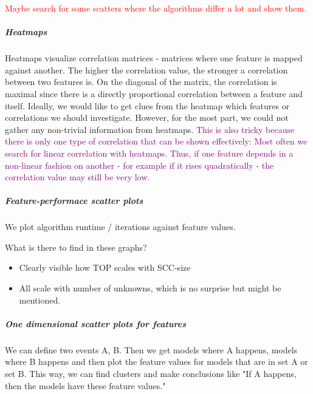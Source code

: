 \textcolor{red}{Maybe search for some scatters where the algorithms differ a lot and show them.}

\subparagraph*{Heatmaps}
Heatmaps visualize correlation matrices - matrices where one feature is mapped against another. The higher the correlation value, the stronger
a correlation between two features is. On the diagonal of the matrix, the correlation is maximal since there is a directly proportional correlation between
a feature and itself. Ideally, we would like to get clues from the heatmap which features or correlations we should investigate.
However, for the most part, we could not gather any non-trivial information from heatmaps. \textcolor{purple}{This is also tricky because
there is only one type of correlation that can be shown effectively: Most often we search for linear correlation with heatmaps. Thus,
if one feature depends in a non-linear fashion on another - for example if it rises quadratically - the correlation value may still be very low.}

\subparagraph*{Feature-performace scatter plots}
We plot algorithm runtime / iterations against feature values.

What is there to find in these graphs?
\begin{itemize}
    \item Clearly visible how TOP scales with SCC-size
    \item All scale with number of unknowns, which is no surprise but might be mentioned.
\end{itemize}

\subparagraph*{One dimensional scatter plots for features}
We can define two events A, B. Then we get models where A happens, models where B happens and then plot the feature values for models that are in set A or set B.
This way, we can find clusters and make conclusions like "If A happens, then the models have these feature values."
\fi